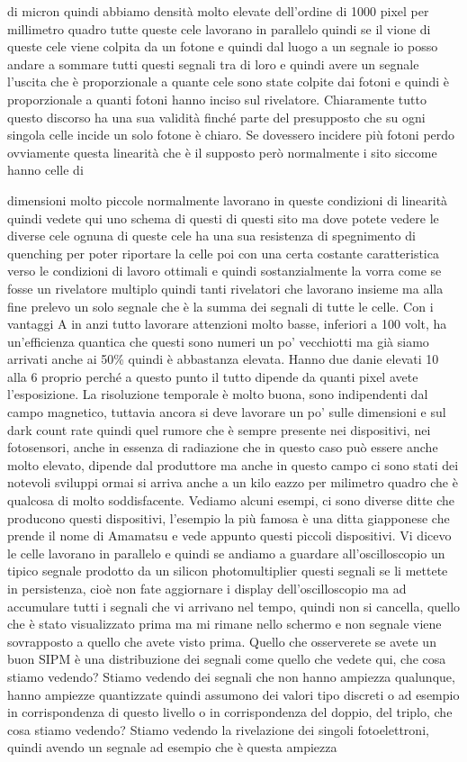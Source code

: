 {di micron quindi abbiamo densità molto elevate dell'ordine di 1000 pixel per millimetro quadro tutte queste cele lavorano in parallelo quindi se il vione di queste cele viene colpita da un fotone e quindi dal luogo a un segnale io posso andare a sommare tutti questi segnali tra di loro e quindi avere un segnale l'uscita che è proporzionale a quante cele sono state colpite dai fotoni e quindi è proporzionale a quanti fotoni hanno inciso sul rivelatore. Chiaramente tutto questo discorso ha una sua validità finché parte del presupposto che su ogni singola celle incide un solo fotone è chiaro. Se dovessero incidere più fotoni perdo ovviamente questa linearità che è il supposto però normalmente i sito siccome hanno celle di 

dimensioni molto piccole normalmente lavorano in queste condizioni di linearità quindi vedete qui uno schema di questi di questi sito ma dove potete vedere le diverse cele ognuna di queste cele ha una sua resistenza di spegnimento di quenching per poter riportare la celle poi con una certa costante caratteristica verso le condizioni di lavoro ottimali e quindi sostanzialmente la vorra come se fosse un rivelatore multiplo quindi tanti rivelatori che lavorano insieme ma alla fine prelevo un solo segnale che è la summa dei segnali di tutte le celle. Con i vantaggi A in anzi tutto lavorare attenzioni molto basse, inferiori a 100 volt, ha un'efficienza quantica che questi sono numeri un po' vecchiotti ma già siamo arrivati anche ai 50\% quindi è abbastanza elevata. Hanno due danie elevati 10 alla 6 proprio perché a questo punto il tutto dipende da quanti pixel avete l'esposizione. La risoluzione temporale è molto buona, sono indipendenti dal campo magnetico, tuttavia ancora si deve lavorare un po' sulle dimensioni e sul dark count rate quindi quel rumore che è sempre presente nei dispositivi, nei fotosensori, anche in essenza di radiazione che in questo caso può essere anche molto elevato, dipende dal produttore ma anche in questo campo ci sono stati dei notevoli sviluppi ormai si arriva anche a un kilo eazzo per milimetro quadro che è qualcosa di molto soddisfacente. Vediamo alcuni esempi, ci sono diverse ditte che producono questi dispositivi, l'esempio la più famosa è una ditta giapponese che prende il nome di Amamatsu e vede appunto questi piccoli dispositivi. Vi dicevo le celle lavorano in parallelo e quindi se andiamo a guardare all'oscilloscopio un tipico segnale prodotto da un silicon photomultiplier questi segnali se li mettete in persistenza, cioè non fate aggiornare i display dell'oscilloscopio ma ad accumulare tutti i segnali che vi arrivano nel tempo, quindi non si cancella, quello che è stato visualizzato prima ma mi rimane nello schermo e non segnale viene sovrapposto a quello che avete visto prima. Quello che osserverete se avete un buon SIPM è una distribuzione dei segnali come quello che vedete qui, che cosa stiamo vedendo? Stiamo vedendo dei segnali che non hanno ampiezza qualunque, hanno ampiezze quantizzate quindi assumono dei valori tipo discreti o ad esempio in corrispondenza di questo livello o in corrispondenza del doppio, del triplo, che cosa stiamo vedendo? Stiamo vedendo la rivelazione dei singoli fotoelettroni, quindi avendo un segnale ad esempio che è questa ampiezza }
